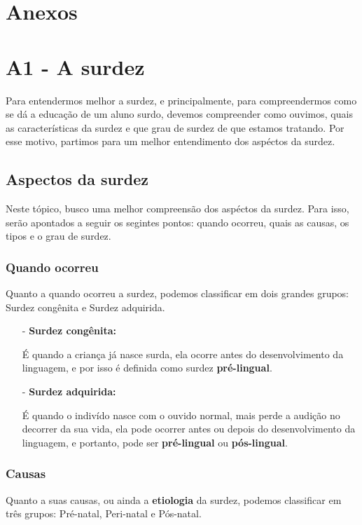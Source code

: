 \documentclass[brasil]{abnt}
\begin{document}
\chapter*{Anexos}

\chapter*{A1 - A surdez}
	Para entendermos melhor a surdez, e principalmente, para compreendermos como se dá a educação de um aluno surdo, devemos compreender como ouvimos, quais as características da surdez e 
	que grau de surdez de que estamos tratando. Por esse motivo, partimos para um melhor entendimento dos aspéctos da surdez.	
			
		\section{Aspectos da surdez}
			Neste tópico, busco uma melhor compreensão dos aspéctos da surdez. Para isso, serão apontados a seguir os segintes pontos: quando ocorreu, 
			quais as causas, os tipos e o grau de surdez. 
			
			\subsection{Quando ocorreu}
				Quanto a quando ocorreu a surdez, podemos classificar em dois grandes grupos: Surdez congênita e Surdez adquirida. 
				
				\begin{itemize}		
					\item [-]\textbf{Surdez congênita:} 
					
						É quando a criança já nasce surda, ela ocorre antes do desenvolvimento da linguagem, e por isso é definida como 
						surdez \textbf{pré-lingual}. 
						
					\item[-]\textbf{Surdez adquirida:} 
					
						É quando o indivído nasce com o ouvido normal, mais perde a audição no decorrer da sua vida, ela pode ocorrer antes ou depois do 
						desenvolvimento da linguagem, e portanto, pode ser \textbf{pré-lingual} ou \textbf{pós-lingual}.
				\end{itemize}
				
				
			\subsection{Causas}
				Quanto a suas causas, ou ainda a \textbf{etiologia} da surdez, podemos classificar em três grupos: Pré-natal, Peri-natal e Pós-natal.
			
\end{document}
